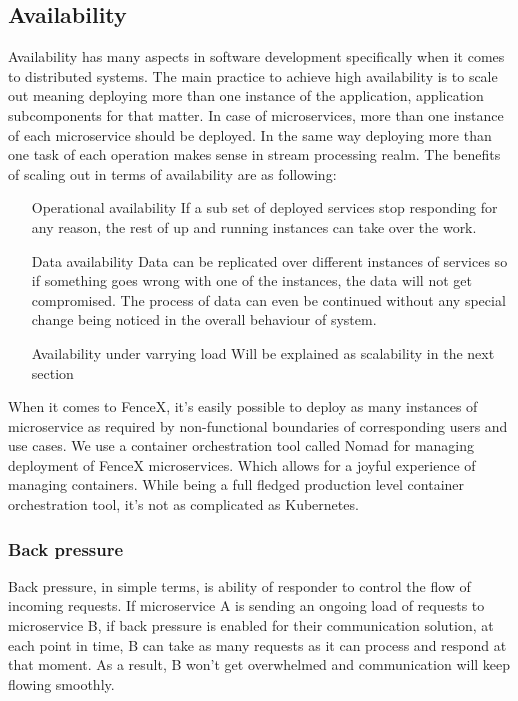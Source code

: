 \documentclass[a4]{report}
\begin{document}
    \subsection{Availability}
    Availability has many aspects in software development specifically when it comes to distributed systems.
    The main practice to achieve high availability is to scale out meaning deploying more than one instance of the
    application, application subcomponents for that matter.
    In case of microservices, more than one instance of each microservice should be deployed.
    In the same way deploying more than one task of each operation makes sense in stream processing realm.
    The benefits of scaling out in terms of availability are as following:
    \begin{itemize}
        \item[Operational availability] If a sub set of deployed services stop responding for any reason, the rest of
        up and running instances can take over the work.
        \item[Data availability] Data can be replicated over different instances of services so if something goes
        wrong with one of the instances, the data will not get compromised.
        The process of data can even be continued without any special change being noticed in the overall behaviour of
        system.
        \item[Availability under varrying load] Will be explained as scalability in the next section
    \end{itemize}

    When it comes to FenceX, it's easily possible to deploy as many instances of microservice as required by
    non-functional boundaries of corresponding users and use cases.
    We use a container orchestration tool called Nomad for managing deployment of FenceX microservices.
    Which allows for a joyful experience of managing containers.
    While being a full fledged production level container orchestration tool, it's not as complicated as Kubernetes.

    \subsubsection{Back pressure \cite{reactive-manifesto}}
    Back pressure, in simple terms, is ability of responder to control the flow of incoming requests.
    If microservice A is sending an ongoing load of requests to microservice B, if back pressure is enabled for
    their communication solution, at each point in time, B can take as many requests as it can process and respond at
    that moment.
    As a result, B won't get overwhelmed and communication will keep flowing smoothly.
\end{document}
